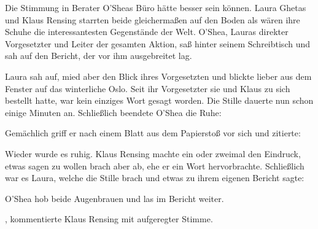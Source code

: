Die Stimmung in Berater O’Sheas Büro hätte besser sein können. Laura Ghetas und Klaus Rensing starrten beide gleichermaßen auf den Boden als wären ihre Schuhe die interessantesten Gegenstände der Welt. O’Shea, Lauras direkter Vorgesetzter und Leiter der gesamten Aktion, saß hinter seinem Schreibtisch und sah auf den Bericht, der vor ihm ausgebreitet lag.

\par

Laura sah auf, mied aber den Blick ihres Vorgesetzten und blickte lieber aus dem Fenster auf das winterliche Oslo. Seit ihr Vorgesetzter sie und Klaus zu sich bestellt hatte, war kein einziges Wort gesagt worden. Die Stille dauerte nun schon einige Minuten an. Schließlich beendete O’Shea die Ruhe: 

\par

Gemächlich griff er nach einem Blatt aus dem Papierstoß vor sich und zitierte: 

\par

Wieder wurde es ruhig. Klaus Rensing machte ein oder zweimal den Eindruck, etwas sagen zu wollen brach aber ab, ehe er ein Wort hervorbrachte. Schließlich war es Laura, welche die Stille brach und etwas zu ihrem eigenen Bericht sagte: 

\par

O’Shea hob beide Augenbrauen und las im Bericht weiter. 

\par

, kommentierte Klaus Rensing mit aufgeregter Stimme. 

\par


